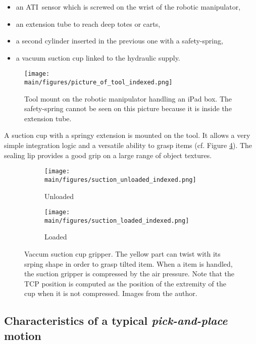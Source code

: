 \documentclass[/home/francois/latex/report/main.tex]{subfiles}
\begin{document}
\begin{itemize}
  \item an ATI\texttrademark \ sensor which is screwed on the wrist of the robotic manipulator,
  \item an extension tube to reach deep totes or carts,
  \item a second cylinder inserted in the previous one with a safety-spring,
  \item a vacuum suction cup linked to the hydraulic supply.
\end{itemize}

\begin{figure}[h]
  \centering
  \texttt{[image: \\main/figures/picture\_of\_tool\_indexed.png]}
  \caption{Tool mount on the robotic manipulator handling an iPad box. The safety-spring cannot be seen on this picture because it is inside the extension tube.}
  \label{fig:background:tool}
\end{figure}

A suction cup with a springy extension is mounted on the tool. It allows a very simple integration logic and a versatile ability to grasp items (cf. Figure \ref{fig:background:suction}). The sealing lip provides a good grip on a large range of object textures.

\begin{figure}[h]
\centering
\begin{subfigure}{0.49\textwidth}
\centering
\texttt{[image: \\main/figures/suction\_unloaded\_indexed.png]}
\caption{Unloaded}
\label{fig:background:suction-unloaded}
\end{subfigure}
\begin{subfigure}{0.49\textwidth}
\centering
\texttt{[image: \\main/figures/suction\_loaded\_indexed.png]}
\caption{Loaded}
\label{fig:background:suction-loaded}
\end{subfigure}
\caption{Vaccum suction cup gripper. The yellow part can twist with its srping shape in order to grasp tilted item. When a item is handled, the suction gripper is compressed by the air pressure. Note that the \ac{TCP} position is computed as the position of the extremity of the cup when it is not compressed. Images from the author.}
\label{fig:background:suction}
\end{figure}

\subsection{Characteristics of a typical \textit{pick-and-place} motion}
\label{background:motion}
\end{document}
